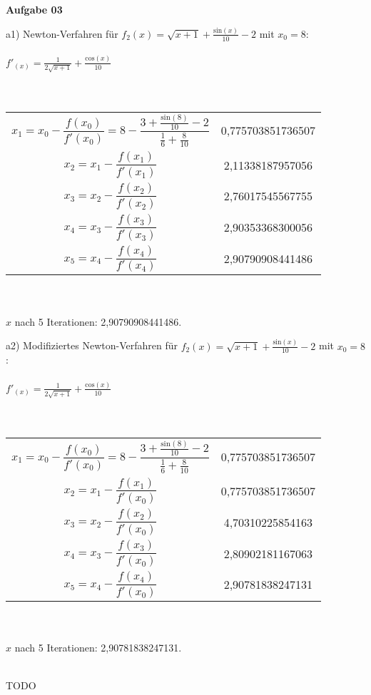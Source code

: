 \documentclass[a4paper,10pt]{article}
\begin{document}
	\parindent0pt
	\textbf{Aufgabe 03}\\
	\begin{compactenum}[a)]
		\item 
		\begin{compactenum}
			\item [a1)]
			Newton-Verfahren für $f_2(x) = \sqrt{x + 1} + \frac{\mathrm{sin}(x)}{10} - 2$ mit $x_0 = 8$:\\\\
			$f'_(x) = \frac{1}{2\sqrt{x + 1}} + \frac{\mathrm{cos}(x)}{10}$\\\\\\
			\setlength{\extrarowheight}{12pt}
			\begin{tabular}{|c|c|}
				\hline
				$x_1 = x_0 - \dfrac{f(x_0)}{f'(x_0)} = 8 - \dfrac{3 + \frac{\mathrm{sin(8)}}{10} - 2}{\frac{1}{6} + \frac{\mathrm{8}}{10}}$ & 0,775703851736507 \\
				$x_2 = x_1 - \dfrac{f(x_1)}{f'(x_1)}$ & 2,11338187957056 \\ 
				$x_3 = x_2 - \dfrac{f(x_2)}{f'(x_2)}$ & 2,76017545567755\\
				$x_4 = x_3 - \dfrac{f(x_3)}{f'(x_3)}$ & 2,90353368300056\\
				$x_5 = x_4 - \dfrac{f(x_4)}{f'(x_4)}$ & 2,90790908441486\\
				\hline
			\end{tabular}
			\setlength{\extrarowheight}{0pt}
			\ \\\\
			$x$ nach 5 Iterationen: 2,90790908441486.\\
			\item [a2)]
			Modifiziertes Newton-Verfahren für $f_2(x) = \sqrt{x + 1} + \frac{\mathrm{sin}(x)}{10} - 2$ mit $x_0 = 8$:\\\\
			$f'_(x) = \frac{1}{2\sqrt{x + 1}} + \frac{\mathrm{cos}(x)}{10}$\\\\\\
			\setlength{\extrarowheight}{12pt}
			\begin{tabular}{|c|c|}
				\hline
				$x_1 = x_0 - \dfrac{f(x_0)}{f'(x_0)} = 8 - \dfrac{3 + \frac{\mathrm{sin(8)}}{10} - 2}{\frac{1}{6} + \frac{\mathrm{8}}{10}}$ & 0,775703851736507 \\
				$x_2 = x_1 - \dfrac{f(x_1)}{f'(x_0)}$ & 0,775703851736507 \\
				$x_3 = x_2 - \dfrac{f(x_2)}{f'(x_0)}$ & 4,70310225854163 \\
				$x_4 = x_3 - \dfrac{f(x_3)}{f'(x_0)}$ & 2,80902181167063 \\
				$x_5 = x_4 - \dfrac{f(x_4)}{f'(x_0)}$ & 2,90781838247131 \\
				\hline
			\end{tabular}
			\setlength{\extrarowheight}{0pt}
			\ \\\\
			$x$ nach 5 Iterationen: 2,90781838247131.\\\\
		\end{compactenum}
		\item TODO
	\end{compactenum}
\end{document}
